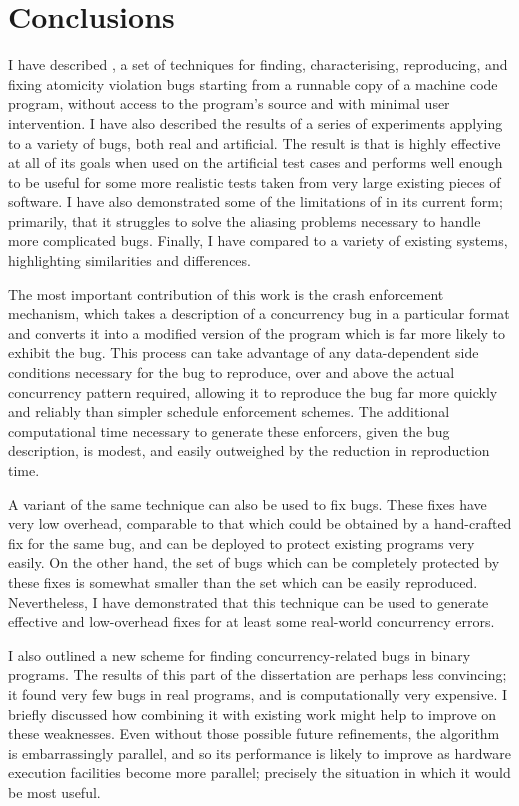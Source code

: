 \cleardoublepage
\chapter{Conclusions}
\label{sect:concl}

I have described {\technique}, a set of techniques for finding,
characterising, reproducing, and fixing atomicity violation bugs
starting from a runnable copy of a machine code program, without
access to the program's source and with minimal user intervention.  I
have also described the results of a series of experiments applying
{\technique} to a variety of bugs, both real and artificial.  The
result is that {\technique} is highly effective at all of its goals
when used on the artificial test cases and performs well enough to be
useful for some more realistic tests taken from very large existing
pieces of software.  I have also demonstrated some of the limitations
of {\technique} in its current form; primarily, that it struggles to
solve the aliasing problems necessary to handle more complicated bugs.
Finally, I have compared {\technique} to a variety of existing
systems, highlighting similarities and differences.

The most important contribution of this work is the crash enforcement
mechanism, which takes a description of a concurrency bug in a
particular format and converts it into a modified version of the
program which is far more likely to exhibit the bug.  This process can
take advantage of any data-dependent side conditions necessary for the
bug to reproduce, over and above the actual concurrency pattern
required, allowing it to reproduce the bug far more quickly and
reliably than simpler schedule enforcement schemes.  The additional
computational time necessary to generate these enforcers, given the
bug description, is modest, and easily outweighed by the reduction in
reproduction time.

A variant of the same technique can also be used to fix bugs.  These
fixes have very low overhead, comparable to that which could be
obtained by a hand-crafted fix for the same bug, and can be deployed
to protect existing programs very easily.  On the other hand, the set
of bugs which can be completely protected by these fixes is somewhat
smaller than the set which can be easily reproduced.  Nevertheless, I
have demonstrated that this technique can be used to generate
effective and low-overhead fixes for at least some real-world
concurrency errors.

I also outlined a new scheme for finding concurrency-related bugs in
binary programs.  The results of this part of the dissertation are
perhaps less convincing; it found very few bugs in real programs, and
is computationally very expensive.  I briefly discussed how combining
it with existing work might help to improve on these weaknesses.  Even
without those possible future refinements, the algorithm is
embarrassingly parallel, and so its performance is likely to improve
as hardware execution facilities become more parallel; precisely the
situation in which it would be most useful.
